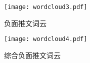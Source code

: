 \documentclass[12pt,AutoFakeBold]{article}
\begin{document}
\begin{figure}[htbp]
	\centering
    \texttt{[image: wordcloud3.pdf]}
    \caption{负面推文词云} \label{fig:wordcloud3}
\end{figure}

\begin{figure}[htbp]
	\centering
    \texttt{[image: wordcloud4.pdf]}
    \caption{综合负面推文词云} \label{fig:wordcloud4}
\end{figure}




%  
\end{document}
